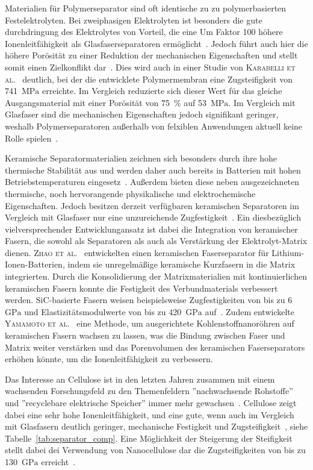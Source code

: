 Materialien für Polymerseparator sind oft identische zu zu polymerbasierten Festelektrolyten. Bei zweiphasigen Elektrolyten ist besonders die gute durchdringung des Elektrolytes von Vorteil, die eine Um Faktor 100 höhere Ionenleitfähigkeit als Glasfaserseparatoren ermöglicht~\cite{Wang2021a}. Jedoch führt auch hier die höhere Porösität zu einer Reduktion der mechanischen Eigenschaften und stellt somit einen Zielkonflikt dar~\cite{Ahankari2022}. Dies wird auch in einer Studie von \textsc{Karabelli et al.}~\cite{Karabelli2011} deutlich, bei der die entwicklete Polymermembran eine Zugsteifigkeit von 741~$\si{\MPa}$ erreichte. Im Vergleich reduzierte sich dieser Wert für das gleiche Ausgangsmaterial mit einer Porösität von 75~\% auf 53~$\si{\MPa}$. Im Vergleich mit Glasfaser sind die mechanischen Eigenschaften jedoch signifikant geringer, weshalb Polymerseparatoren außerhalb von felxiblen Anwendungen aktuell keine Rolle spielen~\cite{Zschiebsch2024}.

Keramische Separatormaterialien zeichnen sich besonders durch ihre hohe thermische Stabilität aus und werden daher auch bereits in Batterien mit hohen Betriebstemperaturen eingesetz~\cite{Qin2017,Cheong2012}. Außerdem bieten diese neben ausgezeichneten thermische, noch hervorangende physikalische und elektrochemische Eigenschaften. Jedoch besitzen derzeit verfügbaren keramischen Separatoren im Vergleich mit Glasfaser nur eine unzureichende Zugfestigkeit~\cite{Qin2017}.
Ein diesbezüglich vielversprechender Entwicklungansatz ist dabei die Integration von keramischer Fasern, die sowohl als Separatoren als auch als Verstärkung der Elektrolyt-Matrix dienen. \textsc{Zhao et al.}~\cite{Zhao2017} entwickelten einen keramischen Faserseparator für Lithium-Ionen-Batterien, indem sie unregelmäßige keramische Kurzfasern in die Matrix integrierten. Durch die Konsolidierung der Matrixmaterialien mit kontinuierlichen keramischen Fasern konnte die Festigkeit des Verbundmaterials verbessert werden. SiC-basierte Fasern weisen beispielsweise Zugfestigkeiten von bis zu 6~$\si{\GPa}$ und Elastizitätsmodulwerte von bis zu 420~$\si{\GPa}$ auf~\cite{Seydibeyoglu2017}. Zudem entwickelte \textsc{Yamamoto et al.}~\cite{Yamamoto2009} eine Methode, um ausgerichtete Kohlenstoffnanoröhren auf keramischen Fasern wachsen zu lassen, was die Bindung zwischen Faser und Matrix weiter verstärken und das Porenvolumen des keramischen Faserseparators erhöhen könnte, um die Ionenleitfähigkeit zu verbessern.

Das Interesse an Cellulose ist in den letzten Jahren zusammen mit einem wachsenden Forschungsfeld zu den Themenfeldern ''nachwachsende Rohstoffe'' und ''recyclebare elektrische Speicher'' immer mehr gewachsen~\cite{Liang2018,Teng2020}. Cellulose zeigt dabei eine sehr hohe Ionenleitfähigkeit, und eine gute, wenn auch im Vergleich mit Glasfasern deutlich geringer, mechanische Festigkeit und Zugsteifigkeit~\cite{Xu2020}, siehe Tabelle~\ref{tab:separator_comp}. Eine Möglichkeit der Steigerung der Steifigkeit stellt dabei dei Verwendung von Nanocellulose dar die Zugsteifigkeiten von bis zu 130~$\si{\GPa}$ erreicht~\cite{Dufresne2013,Zhang2019}.

